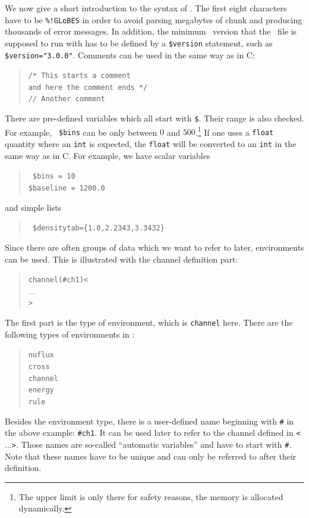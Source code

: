 We now give a short introduction to the syntax of \AEDL .
 The first eight characters have to be {\tt \%!GLoBES}
in order to avoid parsing megabytes of chunk
 and producing thousands of error messages.  In addition, the minimum
\GLOBES\ version that the \AEDL\ file is supposed to run with has to be
defined by a {\tt \$version} statement, such as
{\tt \$version="3.0.0"}.
%
Comments can be used in the same way as in C:
\begin{quote}
{\tt /* This starts a comment\\
 and here the comment ends */ \\
// Another comment
}
\end{quote}
There are pre-defined variables which all start with {\tt \$}. Their range
is also checked. For example,  {\tt 
\$bins} can be only between $0$ and $500$.\footnote{The upper limit is 
only there for safety reasons, the memory is allocated dynamically.} If one uses a {\tt float} quantity where  an {\tt int} is expected, the {\tt float} will be converted to an {\tt int} in the same way as in C.  For example, we have scalar variables
\begin{quote}
{\tt
\$bins = 10\\
\$baseline = 1200.0
}
\end{quote}
and simple lists
\begin{quote}
{\tt
\$densitytab=\{1.0,2.2343,3.3432\} 
}
\end{quote}
%
Since there are often groups of data which we want to refer to later,
environments can be used. This is illustrated 
with the channel definition part:
\begin{quote}
{\tt channel(\#ch1)<\\
\tb  $\ldots$\\
>
}
\end{quote}
The first part is the type of environment, which is {\tt channel} here. 
There are the following types of environments in \AEDL :
\begin{quote}
{\tt nuflux\\
cross\\
channel\\
energy\\
rule
}
\end{quote}
Besides the environment type, there is a user-defined name 
beginning with {\tt \#}
in the above example: {\tt \#ch1}. It can be used later to refer to the 
channel defined in {\tt <$\ldots$>}. Those names are so-called 
``automatic variables'' and have to start with {\tt \#}. Note that these names have to be unique and can only be referred to after their definition.
